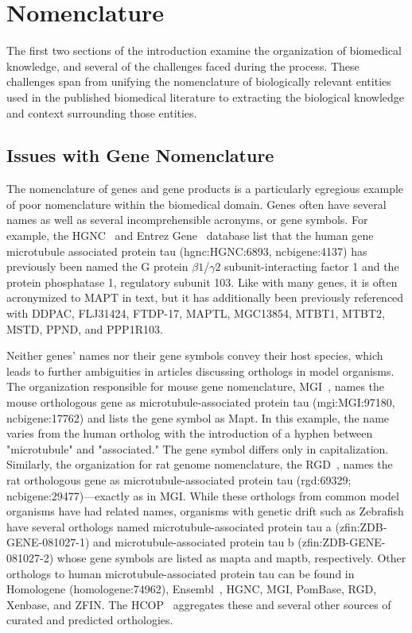 \section{Nomenclature}

The first two sections of the introduction examine the organization of biomedical knowledge, and several of the challenges faced during the process.
These challenges span from unifying the nomenclature of biologically relevant entities used in the published biomedical literature to extracting the biological knowledge and context surrounding those entities.

\subsection{Issues with Gene Nomenclature}

The nomenclature of genes and gene products is a particularly egregious example of poor nomenclature within the biomedical domain.
Genes often have several names as well as several incomprehensible acronyms, or gene symbols.
For example, the \ac{HGNC}~\cite{Yates2017} and Entrez Gene~\cite{Maglott2011} database list that the human gene microtubule associated protein tau (hgnc:HGNC:6893, ncbigene:4137) has previously been named the G protein
$\beta1$/$\gamma2$ subunit-interacting factor 1 and the protein phosphatase 1,
regulatory subunit 103.
Like with many genes, it is often acronymized to MAPT in text, but it has additionally been previously referenced with DDPAC, FLJ31424, FTDP-17, MAPTL, MGC13854, MTBT1, MTBT2, MSTD, PPND, and PPP1R103.

Neither genes' names nor their gene symbols convey their host species, which leads to further ambiguities in articles discussing orthologs in model organisms.
The organization responsible for mouse gene nomenclature, \ac{MGI}~\cite{Blake2017}, names the mouse orthologous gene as microtubule-associated protein tau (mgi:MGI:97180, ncbigene:17762) and lists the gene symbol as Mapt.
In this example, the name varies from the human ortholog with the introduction of a hyphen between "microtubule" and "associated."
The gene symbol differs only in capitalization.
Similarly, the organization for rat genome nomenclature, the \ac{RGD}~\cite{Shimoyama2015}, names the rat orthologous gene as microtubule-associated protein tau (rgd:69329; ncbigene:29477)---exactly as in \ac{MGI}.
While these orthologs from common model organisms have had related names, organisms with genetic drift such as Zebrafish have several orthologs named microtubule-associated protein tau a (zfin:ZDB-GENE-081027-1) and microtubule-associated protein tau b (zfin:ZDB-GENE-081027-2) whose gene symbols are listed as mapta and maptb, respectively.
Other orthologs to human microtubule-associated protein tau can be found in Homologene (homologene:74962), Ensembl~\cite{Zerbino2018}, \ac{HGNC}, \ac{MGI}, PomBase, \ac{RGD}, Xenbase, and \ac{ZFIN}.
The \ac{HCOP}~\cite{Wright2005} aggregates these and several other sources of curated and predicted orthologies.

